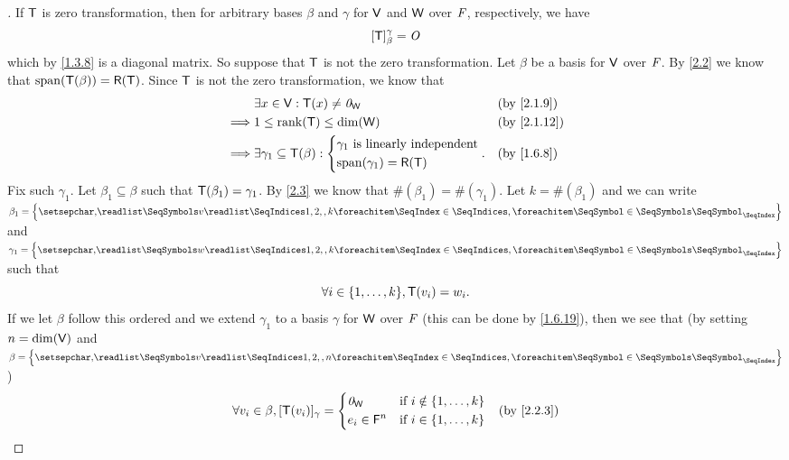 \begin{proof}[]
  If \(\mathsf{T}\) is zero transformation, then for arbitrary bases \(\beta\) and \(\gamma\) for \(\mathsf{V}\) and \(\mathsf{W}\) over \(\mathit{F}\), respectively, we have
  \[
    [\mathsf{T}]_{\beta}^{\gamma} = \mathit{O}
  \]
  which by \cref{1.3.8} is a diagonal matrix.
  So suppose that \(\mathsf{T}\) is not the zero transformation.
  Let \(\beta\) be a basis for \(\mathsf{V}\) over \(\mathit{F}\).
  By \cref{2.2} we know that \(\spn{\T(\beta)} = \rg{\T}\).
  Since \(\mathsf{T}\) is not the zero transformation, we know that
  \begin{align*}
             & \exists x \in \V : \T(x) \neq \zv_{\W}                &  & \text{(by \cref{2.1.9})}  \\
    \implies & 1 \leq \rk{\T} \leq \dim(\W)                          &  & \text{(by \cref{2.1.12})} \\
    \implies & \exists \gamma_1 \subseteq \T(\beta) : \begin{dcases}
                                                        \gamma_1 \text{ is linearly independent} \\
                                                        \spn{\gamma_1} = \rg{\T}
                                                      \end{dcases}. &  & \text{(by \cref{1.6.8})}
  \end{align*}
  Fix such \(\gamma_1\).
  Let \(\beta_1 \subseteq \beta\) such that \(\mathsf{T}(\beta_1) = \gamma_1\).
  By \cref{2.3} we know that \(\#(\beta_1) = \#(\gamma_1)\).
  Let \(k = \#(\beta_1)\) and we can write \(\beta_1 = \set{\seq{v}{1,2,,k}}\) and \(\gamma_1 = \set{\seq{w}{1,2,,k}}\) such that
  \[
    \forall i \in \set{1, \dots, k}, \T(v_i) = w_i.
  \]
  If we let \(\beta\) follow this ordered and we extend \(\gamma_1\) to a basis \(\gamma\) for \(\mathsf{W}\) over \(\mathit{F}\) (this can be done by \cref{1.6.19}), then we see that (by setting \(n = \dim(\mathsf{V})\) and \(\beta = \set{\seq{v}{1,2,,n}}\))
  \begin{align*}
             & \forall v_i \in \beta, [\T(v_i)]_{\gamma} = \begin{dcases}
                                                             \zv_{\W}           & \text{if } i \notin \set{1, \dots, k} \\
                                                             e_i \in \vs{F}^{n} & \text{if } i \in \set{1, \dots, k}
                                                           \end{dcases}   &  & \text{(by \cref{2.2.3})} \\

\end{align*}
\end{proof}

